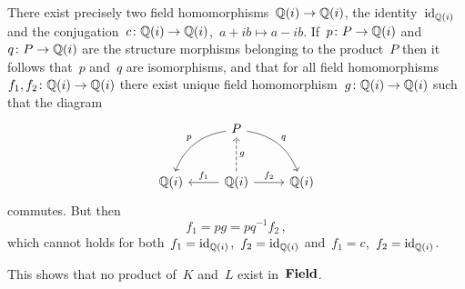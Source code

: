 There exist precisely two field homomorphisms~$\mathbb{Q}(i) \to \mathbb{Q}(i)$, the identity~$\operatorname{id}_{\mathbb{Q}(i)}$ and the conjugation~$c \colon \mathbb{Q}(i) \to \mathbb{Q}(i)$,~$a + ib \mapsto a - ib$.
If~$p \colon P \to \mathbb{Q}(i)$ and~$q \colon P \to \mathbb{Q}(i)$ are the structure morphisms belonging to the product~$P$ then it follows that~$p$ and~$q$ are isomorphisms, and that for all field homomorphisms~$f_1, f_2 \colon \mathbb{Q}(i) \to \mathbb{Q}(i)$ there exist unique field homomorphism~$g \colon \mathbb{Q}(i) \to \mathbb{Q}(i)$ such that the diagram
\[
  \begin{tikzcd}[row sep = large]
      {}
    & P
      \arrow[bend right]{dl}[above left]{p}
      \arrow[bend left]{dr}[above right]{q}
    & {}
    \\
      \Rational(i)
    & \Rational(i)
      \arrow[dashed]{u}[right]{g}
      \arrow{l}[above]{f_1}
      \arrow{r}[above]{f_2}
    & \Rational(i)
  \end{tikzcd}
\]
commutes.
But then
\[
    f_1
  = p g
  = p q^{-1} f_2 \,,
\]
which cannot holds for both~$f_1 = \operatorname{id}_{\mathbb{Q}(i)}$,~$f_2 = \operatorname{id}_{\mathbb{Q}(i)}$ and~$f_1 = c$,~$f_2 = \operatorname{id}_{\mathbb{Q}(i)}$.

This shows that no product of~$K$ and~$L$ exist in~$\mathbf{Field}$.




